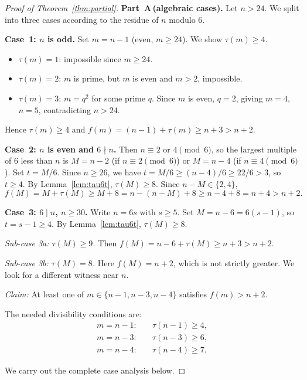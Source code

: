 \documentclass[11pt]{article}
\begin{document}
\begin{proof}[Proof of Theorem~\ref{thm:partial}]

\medskip\noindent\textbf{Part~A\,(algebraic cases).}
Let $n > 24$.  We split into three cases according to the residue of $n$ modulo $6$.

\bigskip
\noindent\textbf{Case~1: $n$ is odd.}
Set $m = n - 1$ (even, $m \ge 24$). We show $\tau(m) \ge 4$.
\begin{itemize}
  \item $\tau(m) = 1$: impossible since $m \ge 24$.
  \item $\tau(m) = 2$: $m$ is prime, but $m$ is even and $m > 2$, impossible.
  \item $\tau(m) = 3$: $m = q^2$ for some prime $q$.  Since $m$ is even, $q = 2$,
        giving $m = 4$, $n = 5$, contradicting $n > 24$.
\end{itemize}
Hence $\tau(m) \ge 4$ and $f(m) = (n-1) + \tau(m) \ge n + 3 > n + 2$.

\bigskip
\noindent\textbf{Case~2: $n$ is even and $6 \nmid n$.}
Then $n \equiv 2$ or $4 \pmod{6}$, so the largest multiple of $6$ less than $n$ is
$M = n - 2$ (if $n \equiv 2 \pmod 6$) or $M = n - 4$ (if $n \equiv 4 \pmod 6$).
Set $t = M/6$.  Since $n \ge 26$, we have $t = M/6 \ge (n-4)/6 \ge 22/6 > 3$,
so $t \ge 4$.  By Lemma~\ref{lem:tau6t}, $\tau(M) \ge 8$.  Since $n - M \in \{2,4\}$,
\[
  f(M) = M + \tau(M) \ge M + 8 = n - (n-M) + 8 \ge n - 4 + 8 = n + 4 > n + 2.
\]

\bigskip
\noindent\textbf{Case~3: $6 \mid n$, $n \ge 30$.}
Write $n = 6s$ with $s \ge 5$.  Set $M = n - 6 = 6(s-1)$, so $t = s - 1 \ge 4$.
By Lemma~\ref{lem:tau6t}, $\tau(M) \ge 8$.

\noindent\textit{Sub-case 3a: $\tau(M) \ge 9$.}
Then $f(M) = n - 6 + \tau(M) \ge n + 3 > n + 2$.

\noindent\textit{Sub-case 3b: $\tau(M) = 8$.}
Here $f(M) = n + 2$, which is not strictly greater.  We look for a different witness
near $n$.

\noindent\textit{Claim:} At least one of $m \in \{n-1, n-3, n-4\}$ satisfies $f(m) > n+2$.

The needed divisibility conditions are:
\begin{align*}
  m = n-1: &\quad \tau(n-1) \ge 4, \\
  m = n-3: &\quad \tau(n-3) \ge 6, \\
  m = n-4: &\quad \tau(n-4) \ge 7.
\end{align*}

We carry out the complete case analysis below.


\end{proof}
\end{document}
